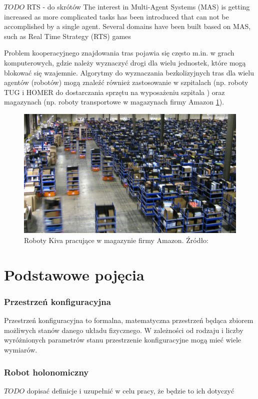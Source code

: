 $TODO$ RTS - do skrótów
The interest in Multi-Agent Systems (MAS) is getting increased as more
complicated tasks has been introduced that can not be accomplished by a
single agent. Several domains have been built based on MAS, such as Real
Time Strategy (RTS) games 

Problem kooperacyjnego znajdowania tras pojawia się często m.in. w grach komputerowych, gdzie należy wyznaczyć drogi dla wielu jednostek, które mogą blokować się wzajemnie. Algorytmy do wyznaczania bezkolizyjnych tras dla wielu agentów (robotów) mogą znaleźć również zastosowanie w szpitalach (np. roboty TUG i HOMER do dostarczania sprzętu na wyposażeniu szpitala \cite{tughomer}) oraz magazynach (np. roboty transportowe w magazynach firmy Amazon \ref{fig:image_kiva_amazon}).

\begin{figure}[H]
	\centering
	\includegraphics[width=14cm]{img/kiva-amazon}
	\caption{Roboty Kiva pracujące w magazynie firmy Amazon. Źródło: \cite{amazonkiva}}
	\label{fig:image_kiva_amazon}
\end{figure}

\section{Podstawowe pojęcia}
\subsubsection{Przestrzeń konfiguracyjna}
Przestrzeń konfiguracyjna to formalna, matematyczna przestrzeń będąca zbiorem możliwych stanów danego układu fizycznego.
W zależności od rodzaju i liczby wyróżnionych parametrów stanu przestrzenie konfiguracyjne mogą mieć wiele wymiarów.

\subsubsection{Robot holonomiczny}
$TODO$ dopisać definicje i uzupełnić w celu pracy, że będzie to ich dotyczyć

